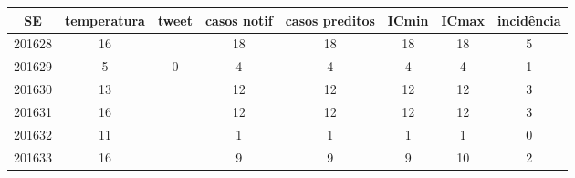 \begin{tabular}{c|ccccccc}
  \hline
SE & temperatura & tweet & casos notif & casos preditos & ICmin & ICmax & incidência \\ 
  \hline
201628 & 16 &  & 18 & 18 & 18 & 18 & 5 \\ 
  201629 & 5 & 0 & 4 & 4 & 4 & 4 & 1 \\ 
  201630 & 13 &  & 12 & 12 & 12 & 12 & 3 \\ 
  201631 & 16 &  & 12 & 12 & 12 & 12 & 3 \\ 
  201632 & 11 &  & 1 & 1 & 1 & 1 & 0 \\ 
  201633 & 16 &  & 9 & 9 & 9 & 10 & 2 \\ 
   \hline
\end{tabular}
